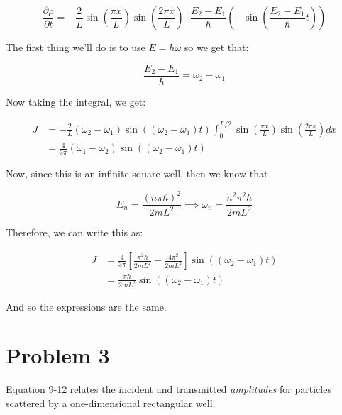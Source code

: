 \documentclass[10pt]{article}
\begin{document}
\begin{enumerate}[(a)]
\begin{solution}
            \[ \frac{\partial\rho}{\partial t} = -\frac{2}{L}\sin \left( \frac{\pi x}{L}\right) \sin \left( \frac{2 \pi x}{L}\right) \cdot \frac{E_2 - E_1}{\hbar} \left( -\sin \left( \frac{E_2 - E_1}{\hbar} t\right) \right)\] 

            The first thing we'll do is to use $E = \hbar \omega$ so we get that:

            \[ \frac{E_2 - E_1}{\hbar} = \omega_2 - \omega_1\] 

            Now taking the integral, we get: 

            \begin{align*}
                J &= -\frac{2}{L}(\omega_2 - \omega_1) \sin ((\omega_2 - \omega_1)t) \int_0^{L/2} \sin \left(\frac{\pi x}{L}\right) \sin \left( \frac{2\pi x}{L}\right) dx\\
                &= \frac{4}{3\pi} (\omega_1 - \omega_2) \sin((\omega_2 - \omega_1)t)
            \end{align*}

            Now, since this is an infinite square well, then we know that 

            \[ E_n = \frac{(n \pi \hbar)^2}{2mL^2} \implies \omega_n = \frac{n^2\pi^2 \hbar}{2mL^2}\] 

            Therefore, we can write this as: 

            \begin{align*}
                J &= \frac{4}{3\pi}\left[ \frac{\pi^2\hbar}{2mL^2} - \frac{4\pi^2}{2mL^2}\right] \sin ((\omega_2 - \omega_1)t)\\
                &= \frac{\pi\hbar}{2mL^2}\sin((\omega_2 - \omega_1)t)
            \end{align*}

            And so the expressions are the same.


        \end{solution}
    \end{enumerate}

    \pagebreak 

    \section*{Problem 3}

    Equation 9-12 relates the incident and transmitted \textit{amplitudes} for particles scattered by a one-dimensional rectangular well. 
\end{document}
